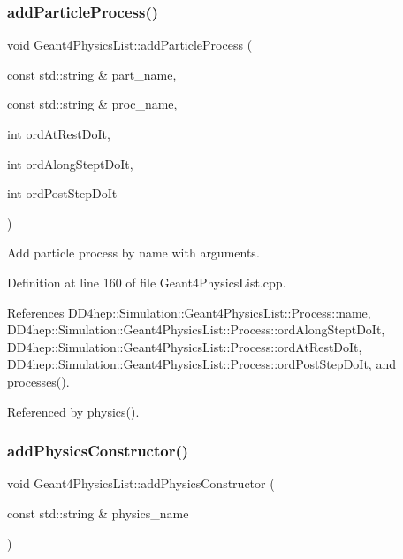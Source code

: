 \subsubsection{\texorpdfstring{add\+Particle\+Process()}{addParticleProcess()}}
{\footnotesize\ttfamily void Geant4\+Physics\+List\+::add\+Particle\+Process (\begin{DoxyParamCaption}\item[{const std\+::string \&}]{part\+\_\+name,  }\item[{const std\+::string \&}]{proc\+\_\+name,  }\item[{int}]{ord\+At\+Rest\+Do\+It,  }\item[{int}]{ord\+Along\+Stept\+Do\+It,  }\item[{int}]{ord\+Post\+Step\+Do\+It }\end{DoxyParamCaption})}



Add particle process by name with arguments. 



Definition at line 160 of file Geant4\+Physics\+List.\+cpp.



References D\+D4hep\+::\+Simulation\+::\+Geant4\+Physics\+List\+::\+Process\+::name, D\+D4hep\+::\+Simulation\+::\+Geant4\+Physics\+List\+::\+Process\+::ord\+Along\+Stept\+Do\+It, D\+D4hep\+::\+Simulation\+::\+Geant4\+Physics\+List\+::\+Process\+::ord\+At\+Rest\+Do\+It, D\+D4hep\+::\+Simulation\+::\+Geant4\+Physics\+List\+::\+Process\+::ord\+Post\+Step\+Do\+It, and processes().



Referenced by physics().

\hypertarget{class_d_d4hep_1_1_simulation_1_1_geant4_physics_list_af9405b117100861f7e365e8362a35fa4}{}\label{class_d_d4hep_1_1_simulation_1_1_geant4_physics_list_af9405b117100861f7e365e8362a35fa4} 
\subsubsection{\texorpdfstring{add\+Physics\+Constructor()}{addPhysicsConstructor()}}
{\footnotesize\ttfamily void Geant4\+Physics\+List\+::add\+Physics\+Constructor (\begin{DoxyParamCaption}\item[{const std\+::string \&}]{physics\+\_\+name }\end{DoxyParamCaption})}



